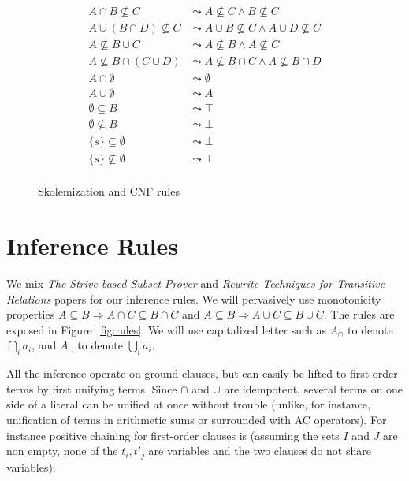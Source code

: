 \documentclass{article}
\begin{document}
\begin{figure}[htbp]
\begin{center}
\begin{align*}
A \cap B \not\subseteq C
    & \leadsto A \not\subseteq C \land B \not\subseteq C \\
A \cup (B \cap D) \not\subseteq C
    & \leadsto A \cup B \not\subseteq C \land A \cup D \not\subseteq C \\
A \not\subseteq B \cup C
    & \leadsto A \not\subseteq B \land A \not\subseteq C \\
A \not\subseteq B \cap (C \cup D)
    & \leadsto A \not\subseteq B \cap C \land A \not\subseteq B \cap D \\
A \cap \emptyset
    & \leadsto \emptyset \\
A \cup \emptyset
    & \leadsto A \\
\emptyset \subseteq B
    & \leadsto \top \\
\emptyset \not\subseteq B
    & \leadsto \bot \\
\{ s \} \subseteq \emptyset
    & \leadsto \bot \\
\{ s \} \not\subseteq \emptyset
    & \leadsto \top \\
\end{align*}
\caption{Skolemization and CNF rules}
\label{fig:skolem}
\end{center}
\end{figure}


\section{Inference Rules}
We mix \emph{The Strive-based Subset Prover} and
\emph{Rewrite Techniques for Transitive Relations} papers for our
inference rules.
We will pervasively use monotonicity properties $A \subseteq B \Rightarrow A \cap C
\subseteq B \cap C$ and $A \subseteq B \Rightarrow A \cup C \subseteq B \cup C$.
The rules are exposed in Figure~\ref{fig:rules}. We will use capitalized
letter such as $A_\cap$ to denote $\bigcap_i a_i$, and $A_\cup$ to denote
$\bigcup_i a_i$.

All the inference operate on ground clauses, but can easily be lifted to
first-order terms by first unifying terms. Since $\cap$ and $\cup$ are
idempotent, several terms on one side of a literal can be unified at once
without trouble (unlike, for instance, unification of terms in arithmetic
sums or surrounded with AC operators). For instance positive chaining
for first-order clauses is (assuming the sets $I$ and $J$ are non empty,
none of the $t_i, t'_j$ are variables
and the two clauses do not share variables):
\end{document}
